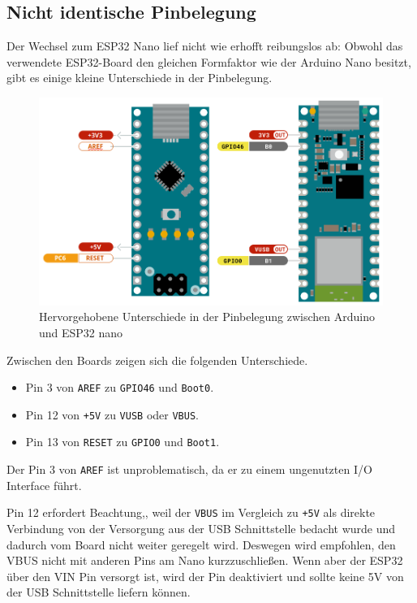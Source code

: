 \subsection{Nicht identische Pinbelegung}
\label{subsec:arduino_to_esp32}
Der Wechsel zum ESP32 Nano lief nicht wie erhofft reibungslos ab:
Obwohl das verwendete ESP32-Board den gleichen Formfaktor wie der Arduino Nano besitzt,
gibt es einige kleine Unterschiede in der Pinbelegung.

\begin{figure}[H]
    \includegraphics[width=\textwidth, center]{img/nano-differences-m.png}
    \caption{Hervorgehobene Unterschiede in der Pinbelegung zwischen Arduino und ESP32 nano}
    \label{fig:nano_boards}
\end{figure}

Zwischen den Boards zeigen sich die folgenden Unterschiede.
\begin{itemize}
    \item Pin 3 von \texttt{AREF} zu \texttt{GPIO46} und \texttt{Boot0}.
    \item Pin 12 von \texttt{+5V} zu \texttt{VUSB} oder \texttt{VBUS}.
    \item Pin 13 von \texttt{RESET} zu \texttt{GPIO0} und \texttt{Boot1}.
\end{itemize}

Der Pin 3 von \texttt{AREF} ist unproblematisch, 
da er zu einem ungenutzten I/O Interface führt.

Pin 12 erfordert Beachtung,, weil der \texttt{VBUS} im Vergleich zu \texttt{+5V} als
direkte Verbindung von der Versorgung aus der USB Schnittstelle bedacht wurde und 
dadurch vom Board nicht weiter geregelt wird. Deswegen wird empfohlen, 
den VBUS nicht mit anderen Pins am Nano kurzzuschließen. 
Wenn aber der ESP32 über den VIN Pin versorgt ist, 
wird der Pin deaktiviert und sollte keine 5V von der USB Schnittstelle liefern können. 


